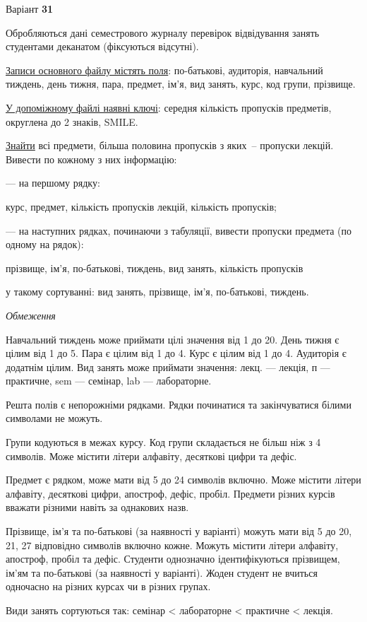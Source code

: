\documentclass[11pt, ukrainian]{article}
\begin{document}


\par
\newpage
{\center Варіант  \No \textbf { 31 }\par}
\bigskip
Обробляються дані семестрового журналу перевірок відвідування занять студентами деканатом (фіксуються відсутні). 

\underline{Записи основного файлу містять поля}: по-батькові, аудиторія, навчальний тиждень, день тижня, пара, предмет, ім’я, вид занять, курс, код групи, прізвище.

\underline{У допоміжному файлі наявні ключі}: середня кількість пропусків предметів, округлена до 2 знаків, SMILE.

\underline{Знайти} всі предмети, більша половина пропусків з яких – пропуски лекцій. Вивести по кожному з них інформацію:\par
{\noindent}--- на першому рядку:\par
курс, предмет, кількість пропусків лекцій, кількість пропусків;

{\noindent}--- на наступних рядках, починаючи з табуляції, вивести пропуски предмета (по одному на рядок):\par
прізвище, ім’я, по-батькові, тиждень, вид занять, кількість пропусків

{\noindent}у такому сортуванні: вид занять, прізвище, ім’я, по-батькові, тиждень.


\bigskip\textit{Обмеження}

Навчальний тиждень може приймати цілі значення від 1 до 20.
День тижня є цілим від 1 до 5. Пара є цілим від 1 до 4.
Курс є цілим від 1 до 4. Аудиторія є додатнім цілим.
Вид занять може приймати значення:
лекц. --- лекція, п --- практичне, sem --- семінар, lab --- лабораторне.

Решта полів є непорожніми рядками.
Рядки починатися та закінчуватися білими символами не можуть.

Групи кодуються в межах курсу.
Код групи складається не більш ніж з 4 символів.
Може містити літери алфавіту, десяткові цифри та дефіс.

Предмет є рядком, може мати від 5 до 24 символів включно.
Може містити літери алфавіту, десяткові цифри, апостроф, дефіс, пробіл.
Предмети різних курсів вважати різними навіть за однакових назв.

Прізвище, ім’я та по-батькові (за наявності у варіанті)
можуть мати від 5 до 20, 21, 27 відповідно символів включно кожне.
Можуть містити літери алфавіту, апостроф, пробіл та дефіс.
Студенти однозначно ідентифікуються прізвищем, ім’ям та по-батькові (за наявності у варіанті).
Жоден студент не вчиться одночасно на різних курсах чи в різних групах.

Види занять сортуються так: семінар < лабораторне < практичне < лекція.



\par
\newpage
\end{document}

